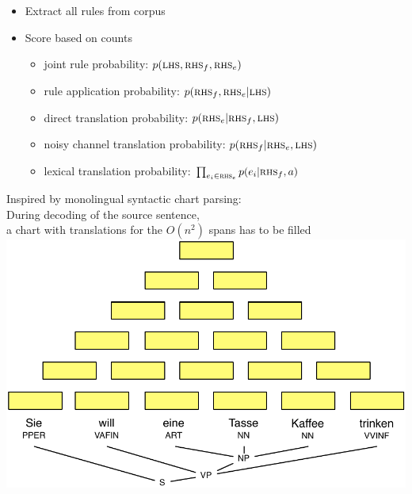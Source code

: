 \documentclass[landscape]{slides}
\begin{document}

\begin{itemize}
\item Extract all rules from corpus
\item Score based on counts
\begin{itemize}
\item joint rule probability: $p(\text{\sc lhs},\text{\sc rhs}_f,\text{\sc rhs}_e)$
\item rule application probability: $p(\text{\sc rhs}_f,\text{\sc rhs}_e|\text{\sc lhs})$
\item direct translation probability: $p(\text{\sc rhs}_e|\text{\sc rhs}_f,\text{\sc lhs})$
\item noisy channel translation probability: $p(\text{\sc rhs}_f|\text{\sc rhs}_e,\text{\sc lhs})$
\item lexical translation probability: $\prod_{e_i \in \text{\sc rhs}_e} p(e_i|\text{\sc rhs}_f,a)$
\end{itemize}
\end{itemize}



\begin{center}
Inspired by monolingual syntactic chart parsing:\\[5mm]
During decoding of the source sentence,\\ a chart with translations for the $O(n^2)$ spans has to be filled\\[10mm]
\includegraphics[scale=1]{chart-parsing-stacks.pdf}
\end{center}
\end{document}

